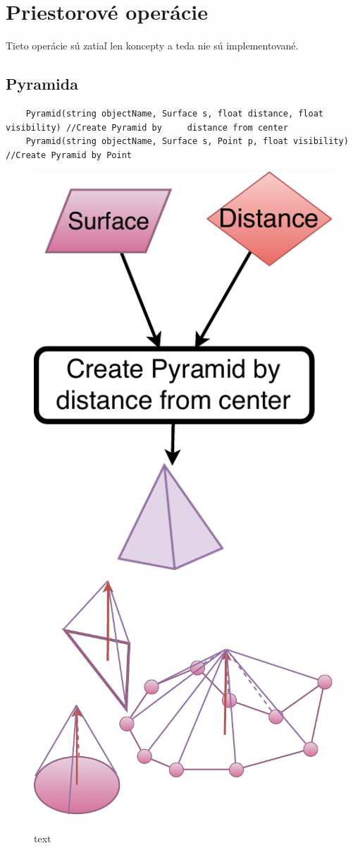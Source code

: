 \section{Priestorové operácie}
Tieto operácie sú zatiaľ len koncepty a teda nie sú implementované.

\subsection{Pyramida}
\begin{lstlisting}
    Pyramid(string objectName, Surface s, float distance, float visibility) //Create Pyramid by     distance from center
    Pyramid(string objectName, Surface s, Point p, float visibility) //Create Pyramid by Point
\end{lstlisting}

\begin{figure}[H]
	\centering
	\includegraphics[height=0.3\textwidth]{obrazky-figures/Diagram/Volumetric/DP Navrh operacii-3D - ObjectsCreate Pyramid by distance from center.pdf}
	\includegraphics[height=0.3\textwidth]{obrazky-figures/Diagram/Draw/4Object/DP Navrh operacii-3D - ObjectsCreate Pyramid by distance from center.pdf}
	\caption{text}
	\label{fig:ObjectsCreate Pyramid by distance from center}
\end{figure}

